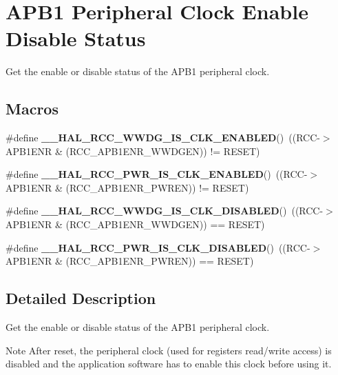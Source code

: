 \hypertarget{group___r_c_c___a_p_b1___clock___enable___disable___status}{}\section{A\+P\+B1 Peripheral Clock Enable Disable Status}
\label{group___r_c_c___a_p_b1___clock___enable___disable___status}


Get the enable or disable status of the A\+P\+B1 peripheral clock.  


\subsection*{Macros}
\begin{DoxyCompactItemize}
\item 
\mbox{\label{group___r_c_c___a_p_b1___clock___enable___disable___status_ga9b26aff2638d1e0613b0ce0530f0cd48}} 
\#define {\bfseries \+\_\+\+\_\+\+H\+A\+L\+\_\+\+R\+C\+C\+\_\+\+W\+W\+D\+G\+\_\+\+I\+S\+\_\+\+C\+L\+K\+\_\+\+E\+N\+A\+B\+L\+ED}()~((R\+CC-\/$>$A\+P\+B1\+E\+NR \& (R\+C\+C\+\_\+\+A\+P\+B1\+E\+N\+R\+\_\+\+W\+W\+D\+G\+EN)) != R\+E\+S\+ET)
\item 
\mbox{\label{group___r_c_c___a_p_b1___clock___enable___disable___status_ga850f4fd113303ed7322577ad023cf748}} 
\#define {\bfseries \+\_\+\+\_\+\+H\+A\+L\+\_\+\+R\+C\+C\+\_\+\+P\+W\+R\+\_\+\+I\+S\+\_\+\+C\+L\+K\+\_\+\+E\+N\+A\+B\+L\+ED}()~((R\+CC-\/$>$A\+P\+B1\+E\+NR \& (R\+C\+C\+\_\+\+A\+P\+B1\+E\+N\+R\+\_\+\+P\+W\+R\+EN)) != R\+E\+S\+ET)
\item 
\mbox{\label{group___r_c_c___a_p_b1___clock___enable___disable___status_ga21d4e081c859ddccd4492343743bb245}} 
\#define {\bfseries \+\_\+\+\_\+\+H\+A\+L\+\_\+\+R\+C\+C\+\_\+\+W\+W\+D\+G\+\_\+\+I\+S\+\_\+\+C\+L\+K\+\_\+\+D\+I\+S\+A\+B\+L\+ED}()~((R\+CC-\/$>$A\+P\+B1\+E\+NR \& (R\+C\+C\+\_\+\+A\+P\+B1\+E\+N\+R\+\_\+\+W\+W\+D\+G\+EN)) == R\+E\+S\+ET)
\item 
\mbox{\label{group___r_c_c___a_p_b1___clock___enable___disable___status_ga1019fdeb30eb4bcb23a0bea2278a94a2}} 
\#define {\bfseries \+\_\+\+\_\+\+H\+A\+L\+\_\+\+R\+C\+C\+\_\+\+P\+W\+R\+\_\+\+I\+S\+\_\+\+C\+L\+K\+\_\+\+D\+I\+S\+A\+B\+L\+ED}()~((R\+CC-\/$>$A\+P\+B1\+E\+NR \& (R\+C\+C\+\_\+\+A\+P\+B1\+E\+N\+R\+\_\+\+P\+W\+R\+EN)) == R\+E\+S\+ET)
\end{DoxyCompactItemize}


\subsection{Detailed Description}
Get the enable or disable status of the A\+P\+B1 peripheral clock. 

\begin{DoxyNote}{Note}
After reset, the peripheral clock (used for registers read/write access) is disabled and the application software has to enable this clock before using it. 
\end{DoxyNote}
